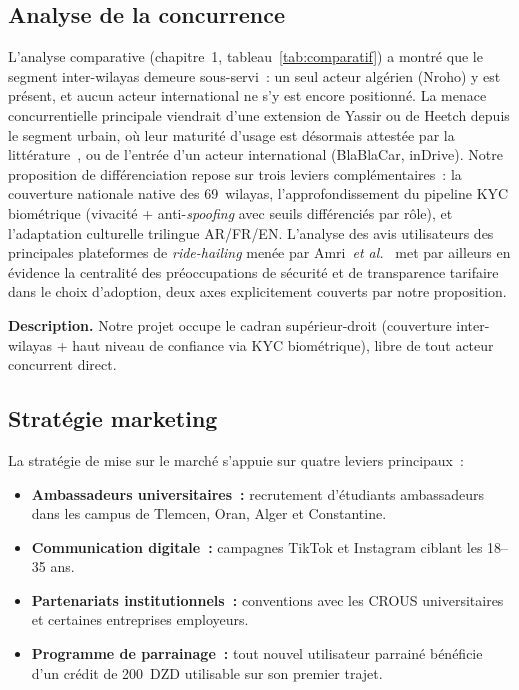 \documentclass[12pt, a4paper, oneside]{report}
\begin{document}
\subsection{Analyse de la concurrence}

L'analyse comparative (chapitre~1, tableau~\ref{tab:comparatif}) a montré que le segment inter-wilayas demeure sous-servi~: un seul acteur algérien (Nroho) y est présent, et aucun acteur international ne s'y est encore positionné. La menace concurrentielle principale viendrait d'une extension de Yassir ou de Heetch depuis le segment urbain, où leur maturité d'usage est désormais attestée par la littérature~\cite{naim_yassir_2024}, ou de l'entrée d'un acteur international (BlaBlaCar, inDrive). Notre proposition de différenciation repose sur trois leviers complémentaires~: la couverture nationale native des 69~wilayas, l'approfondissement du pipeline KYC biométrique (vivacité + anti-\textit{spoofing} avec seuils différenciés par rôle), et l'adaptation culturelle trilingue AR/FR/EN. L'analyse des avis utilisateurs des principales plateformes de \textit{ride-hailing} menée par Amri~\textit{et al.}~\cite{amri_ride_hailing_2024} met par ailleurs en évidence la centralité des préoccupations de sécurité et de transparence tarifaire dans le choix d'adoption, deux axes explicitement couverts par notre proposition.


\textbf{Description.} Notre projet occupe le cadran supérieur-droit (couverture inter-wilayas + haut niveau de confiance via KYC biométrique), libre de tout acteur concurrent direct.

\subsection{Stratégie marketing}

La stratégie de mise sur le marché s'appuie sur quatre leviers principaux~:
\begin{itemize}
  \item \textbf{Ambassadeurs universitaires~:} recrutement d'étudiants ambassadeurs dans les campus de Tlemcen, Oran, Alger et Constantine.
  \item \textbf{Communication digitale~:} campagnes TikTok et Instagram ciblant les 18--35 ans.
  \item \textbf{Partenariats institutionnels~:} conventions avec les CROUS universitaires et certaines entreprises employeurs.
  \item \textbf{Programme de parrainage~:} tout nouvel utilisateur parrainé bénéficie d'un crédit de 200~DZD utilisable sur son premier trajet.
\end{itemize}
\end{document}
